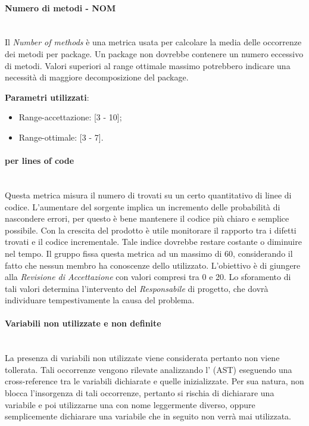 			
			\paragraph{Numero di metodi - NOM}\mbox{} \\
				
			Il \emph{Number of methods} è una metrica usata per calcolare la media delle occorrenze dei metodi per package. Un package non dovrebbe contenere un numero eccessivo di metodi. Valori superiori al range ottimale massimo potrebbero indicare una necessità di maggiore decomposizione del package.
			
			\textbf{Parametri utilizzati}:
			\begin{itemize}
				\item Range-accettazione: [3 - 10];
				\item Range-ottimale: [3 - 7].
			\end{itemize}

			
			\paragraph{ per lines of code}\mbox{} \\
			
			Questa metrica misura il numero di  trovati su un certo quantitativo di linee di codice. L'aumentare del sorgente implica un incremento delle probabilità di nascondere errori, per questo è bene mantenere il codice più chiaro e semplice possibile. Con la crescita del prodotto è utile monitorare il rapporto tra i difetti trovati e il codice incrementale. Tale indice dovrebbe restare costante o diminuire nel tempo.
			Il gruppo fissa questa metrica ad un massimo di 60, considerando il fatto che nessun membro ha conoscenze dello  utilizzato. L’obiettivo è di giungere alla \textit{Revisione di Accettazione} con valori compresi tra 0 e 20. Lo sforamento di tali valori determina l’intervento del \textit{Responsabile} di progetto, che dovrà individuare tempestivamente la causa del problema.


			\paragraph{Variabili non utilizzate e non definite}\mbox{} \\
				
			La presenza di variabili non utilizzate viene considerata  pertanto non viene tollerata. Tali occorrenze vengono rilevate analizzando l' (AST) eseguendo una cross-reference tra le variabili dichiarate e quelle inizializzate. Per sua natura,  non blocca l'insorgenza di tali occorrenze, pertanto si rischia di dichiarare una variabile e poi utilizzarne una con nome leggermente diverso, oppure semplicemente dichiarare una variabile che in seguito non verrà mai utilizzata.
			
